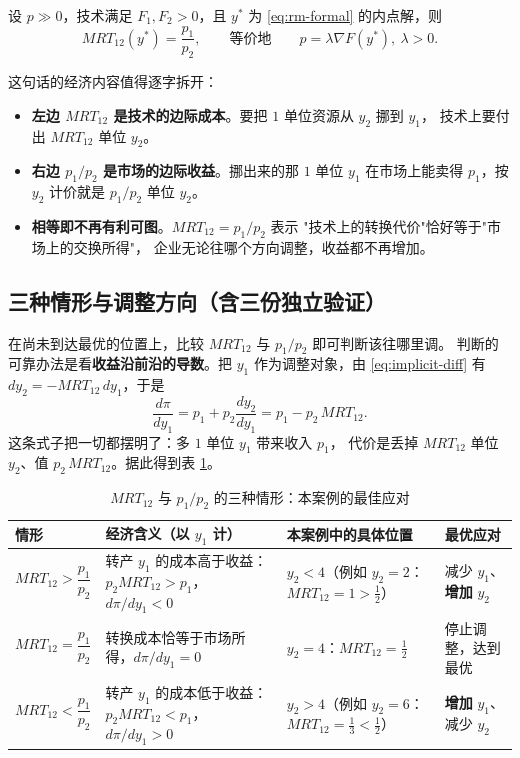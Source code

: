 \begin{theorem}[双产出收益最大化的内点均衡条件]
设 $p\gg 0$，技术满足 $F_1,F_2>0$，且 $y^*$ 为 \eqref{eq:rm-formal} 的内点解，则
\begin{equation}
MRT_{12}(y^{*})=\frac{p_1}{p_2},
\qquad\text{等价地}\qquad
p=\lambda \nabla F(y^{*}),\ \lambda>0.
\label{eq:equilibrium}
\end{equation}
\end{theorem}

这句话的经济内容值得逐字拆开：

\begin{itemize}
  \item \textbf{左边 $MRT_{12}$ 是技术的边际成本}。要把 $1$ 单位资源从 $y_2$ 挪到 $y_1$，
        技术上要付出 $MRT_{12}$ 单位 $y_2$。
  \item \textbf{右边 $p_1/p_2$ 是市场的边际收益}。挪出来的那 $1$ 单位 $y_1$
        在市场上能卖得 $p_1$，按 $y_2$ 计价就是 $p_1/p_2$ 单位 $y_2$。
  \item \textbf{相等即不再有利可图}。$MRT_{12}=p_1/p_2$ 表示
        "技术上的转换代价"恰好等于"市场上的交换所得"，
        企业无论往哪个方向调整，收益都不再增加。
\end{itemize}

\subsection{三种情形与调整方向（含三份独立验证）}

在尚未到达最优的位置上，比较 $MRT_{12}$ 与 $p_1/p_2$ 即可判断该往哪里调。
判断的可靠办法是看\textbf{收益沿前沿的导数}。把 $y_1$ 作为调整对象，由
\eqref{eq:implicit-diff} 有 $dy_2=-MRT_{12}\,dy_1$，于是
\begin{equation}
\frac{d\pi}{dy_1}=p_1+p_2\frac{dy_2}{dy_1}
=p_1-p_2\,MRT_{12}.
\label{eq:dpi-dy1}
\end{equation}
这条式子把一切都摆明了：多 $1$ 单位 $y_1$ 带来收入 $p_1$，
代价是丢掉 $MRT_{12}$ 单位 $y_2$、值 $p_2\,MRT_{12}$。据此得到表 \ref{tab:mrt-cases}。

\begin{table}[H]
\centering
\caption{$MRT_{12}$ 与 $p_1/p_2$ 的三种情形：本案例的最佳应对}
\label{tab:mrt-cases}
\begin{tabular}{p{3.5cm}p{3.3cm}p{3.9cm}p{2.7cm}}
\toprule
情形 & 经济含义（以 $y_1$ 计） & 本案例中的具体位置 & 最优应对 \\
\midrule
$MRT_{12}>\dfrac{p_1}{p_2}$ & 转产 $y_1$ 的成本高于收益：$p_2MRT_{12}>p_1$，$d\pi/dy_1<0$ & $y_2<4$（例如 $y_2=2$：$MRT_{12}=1>\frac12$） & 减少 $y_1$、\textbf{增加} $y_2$ \\[4pt]
$MRT_{12}=\dfrac{p_1}{p_2}$ & 转换成本恰等于市场所得，$d\pi/dy_1=0$ & $y_2=4$：$MRT_{12}=\frac12$ & 停止调整，达到最优 \\[4pt]
$MRT_{12}<\dfrac{p_1}{p_2}$ & 转产 $y_1$ 的成本低于收益：$p_2MRT_{12}<p_1$，$d\pi/dy_1>0$ & $y_2>4$（例如 $y_2=6$：$MRT_{12}=\frac13<\frac12$） & \textbf{增加} $y_1$、减少 $y_2$ \\
\bottomrule
\end{tabular}
\end{table}

